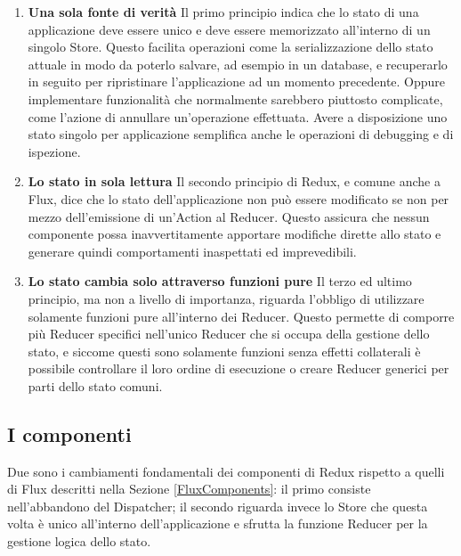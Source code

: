 \begin{enumerate}
    \item \textbf{Una sola fonte di verità} Il primo principio indica che lo stato di una applicazione deve essere unico e deve essere memorizzato all'interno di un singolo Store.
    Questo facilita operazioni come la serializzazione dello stato attuale in modo da poterlo salvare, ad esempio in un database, e recuperarlo in seguito per ripristinare l'applicazione ad un momento precedente. Oppure implementare funzionalità che normalmente sarebbero piuttosto complicate, come l'azione di annullare un'operazione effettuata.
    Avere a disposizione uno stato singolo per applicazione semplifica anche le operazioni di debugging e di ispezione.

    \item \textbf{Lo stato in sola lettura} Il secondo principio di Redux, e comune anche a Flux, dice che lo stato dell'applicazione non può essere modificato se non per mezzo dell'emissione di un'Action al Reducer. Questo assicura che nessun componente possa inavvertitamente apportare modifiche dirette allo stato e generare quindi comportamenti inaspettati ed imprevedibili.

    \item \textbf{Lo stato cambia solo attraverso funzioni pure} Il terzo ed ultimo principio, ma non a livello di importanza, riguarda l'obbligo di utilizzare solamente funzioni pure all'interno dei Reducer. Questo permette di comporre più Reducer specifici nell'unico Reducer che si occupa della gestione dello stato, e siccome questi sono solamente funzioni senza effetti collaterali è possibile controllare il loro ordine di esecuzione o creare Reducer generici per parti dello stato comuni.
\end{enumerate}

\subsection{I componenti}
\label{ReduxComponents}
Due sono i cambiamenti fondamentali dei componenti di Redux rispetto a quelli di Flux descritti nella Sezione \ref{FluxComponents}: il primo consiste nell'abbandono del Dispatcher; il secondo riguarda invece lo Store che questa volta è unico all'interno dell'applicazione e sfrutta la funzione Reducer per la gestione logica dello stato.

